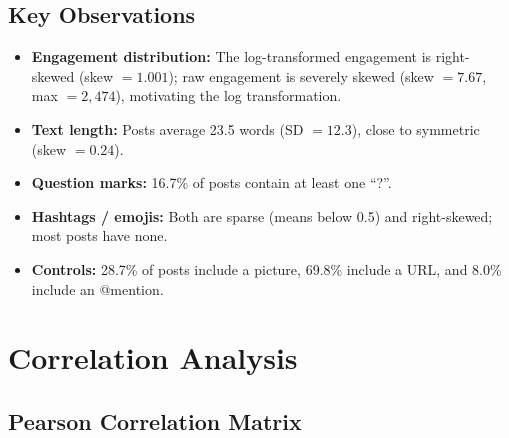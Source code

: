\documentclass[12pt,a4paper]{article}
\begin{document}
\subsection{Key Observations}

\begin{itemize}
    \item \textbf{Engagement distribution:} The log-transformed engagement is right-skewed (skew $=1.001$); raw engagement is severely skewed (skew $=7.67$, max $=2{,}474$), motivating the log transformation.
    \item \textbf{Text length:} Posts average 23.5 words (SD $=12.3$), close to symmetric (skew $=0.24$).
    \item \textbf{Question marks:} 16.7\% of posts contain at least one ``?''.
    \item \textbf{Hashtags / emojis:} Both are sparse (means below 0.5) and right-skewed; most posts have none.
    \item \textbf{Controls:} 28.7\% of posts include a picture, 69.8\% include a URL, and 8.0\% include an @mention.
\end{itemize}

\newpage

\section{Correlation Analysis}

\subsection{Pearson Correlation Matrix}
\end{document}
